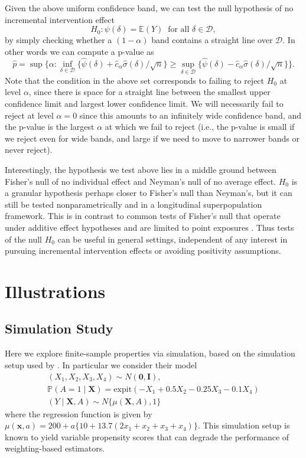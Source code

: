 \documentclass[12pt]{article}
\newcommand{\Pb}{\mathbb{P}}
\newcommand{\E}{\mathbb{E}}
\newcommand{\bX}{\mathbf{X}}
\newcommand{\bx}{\mathbf{x}}
\def\expit{\text{expit}}
\theoremstyle{remark}
\begin{document}
Given the above uniform confidence band, we can test the null hypothesis of no incremental intervention effect
$$ H_0: \psi(\delta) = \E(Y) \ \text{ for all } \delta \in \mathcal{D} , $$
by simply checking whether a $(1-\alpha)$ band contains a straight line over $\mathcal{D}$. In other words we can compute a p-value as
$$ \hat{p} = \sup \Big\{ \alpha : \inf_{\delta \in \mathcal{D}} \{ \hat\psi(\delta) + \hat{c}_\alpha \hat\sigma(\delta) / \sqrt{n} \} \geq \sup_{\delta \in \mathcal{D}} \{ \hat\psi(\delta) - \hat{c}_\alpha \hat\sigma(\delta) / \sqrt{n} \} \Big\} . $$
Note that the condition in the above set corresponds to failing to reject $H_0$ at level $\alpha$, since there is space for a straight line between the smallest upper confidence limit and largest lower confidence limit. We will necessarily fail to reject at level $\alpha=0$ since this amounts to an infinitely wide confidence band, and the p-value is the largest $\alpha$ at which we fail to reject (i.e., the p-value is small if we reject even for wide bands, and large if we need to move to narrower bands or never reject).

Interestingly, the hypothesis we test above lies in a middle ground between Fisher's null of no individual effect and Neyman's null of no average effect. $H_0$ is a granular hypothesis perhaps closer to Fisher's null than Neyman's, but it can still be tested nonparametrically and in a longitudinal superpopulation framework. This is in contrast to common tests of Fisher's null that operate under additive effect hypotheses and are limited to point exposures \autocite{rosenbaum2002covariance}. Thus tests of the null $H_0$ can be useful in general settings, independent of any interest in pursuing incremental intervention effects or avoiding positivity assumptions.

\section{Illustrations}

\subsection{Simulation Study}

Here we explore finite-sample properties via simulation, based on the simulation setup used by \textcite{kang2007demystifying}. In particular we consider their model
\begin{equation*}
\begin{gathered}
(X_1,X_2,X_3,X_4) \sim N(\mathbf{0},\mathbf{I}) , \\
\Pb(A=1 \mid \bX)= \expit(-X_1 + 0.5 X_2 - 0.25 X_3 - 0.1 X_4)  \\
(Y \mid \bX, A) \sim N\{ \mu(\bX,A) , 1 \} 
\end{gathered}
\end{equation*}
where the regression function is given by $\mu(\bx,a) = 200 + a\{10 + 13.7(2x_1 + x_2 + x_3 + x_4)\}$. 
This simulation setup is known to yield variable propensity scores that can degrade the performance of weighting-based estimators. 
\end{document}
